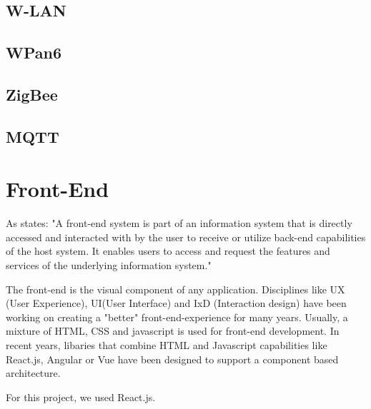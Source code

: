 \subsection{W-LAN}
\subsection{WPan6}
\subsection{ZigBee}
\subsection{MQTT}

\section{Front-End}
As \parencite{frontend} states:
"A front-end system is part of an information system that is directly accessed and interacted with by the user to receive or 
utilize back-end capabilities of the host system. 
It enables users to access and request the features and services of the underlying information system."  

The front-end is the visual component of any application. Disciplines like UX (User Experience), UI(User Interface) and  IxD (Interaction design) have been working on creating 
a "better" front-end-experience for many years. Usually, a mixture of HTML, CSS and javascript is used for front-end development. 
In recent years, libaries that combine HTML and Javascript capabilities like React.js, Angular or Vue %
have been designed to support a component based architecture. 

For this project, we used React.js.


